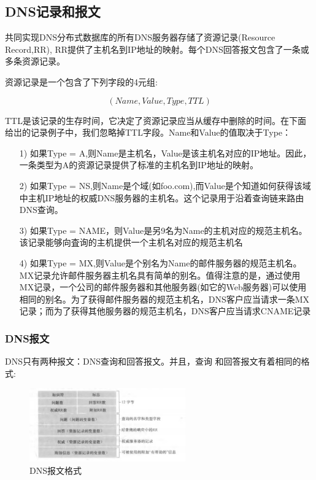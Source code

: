 \subsection{DNS记录和报文}

    共同实现DNS分布式数据库的所有DNS服务器存储了资源记录(Resource Record,RR), RR提供了主机名到IP地址的映射。每个DNS回答报文包含了一条或多条资源记录。

    资源记录是一个包含了下列字段的4元组:

$$
    (Name, Value, Type, TTL)
$$

    TTL是该记录的生存时间，它决定了资源记录应当从缓存中删除的时间。在下面给岀的记录例子中，我们忽略掉TTL字段。Name和Value的值取决于Type：

\begin{itemize}
    \item [1)] 如果Type = A,则Name是主机名，Value是该主机名对应的IP地址。因此，一条类型为A的资源记录提供了标准的主机名到IP地址的映射。
    \item [2)] 如果Type = NS,则Name是个域(如foo.com),而Value是个知道如何获得该域中主机IP地址的权威DNS服务器的主机名。这个记录用于沿着查询链来路由DNS查询。
    \item [3)] 如果Type = NAME，则Value是另9名为Name的主机对应的规范主机名。该记录能够向査询的主机提供一个主机名对应的规范主机名
    \item [4)] 如果Type = MX,则Value是个别名为Name的邮件服务器的规范主机名。MX记录允许邮件服务器主机名具有简单的别名。值得注意的是，通过使用MX记录，一个公司的邮件服务器和其他服务器(如它的Web服务器)可以使用相同的别名。为了获得邮件服务器的规范主机名，DNS客户应当请求一条MX记录；而为了获得其他服务器的规范主机名，DNS客户应当请求CNAME记录
\end{itemize}

\subsubsection{DNS报文}

    DNS只有两种报文：DNS查询和回答报文。并且，查询 和回答报文有着相同的格式:

\begin{figure}[!htbp]
    \centering
    \includegraphics[width=0.6\textwidth]{image/chapter02/DNS报文格式.png}
    \caption{DNS报文格式}
\end{figure}

